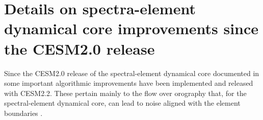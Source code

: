 \documentclass[draft]{agujournal2019}
\begin{document}
%
%



%
%
%
%
\appendix
\section{Details on spectra-element dynamical core improvements since the CESM2.0 release}
Since the CESM2.0 release of the spectral-element dynamical core documented in  some important algorithmic improvements have been implemented and released with CESM2.2. These pertain mainly to the flow over orography that, for the spectral-element dynamical core, can lead to noise aligned with the element boundaries \cite{HL2018MWR}.
\end{document}
